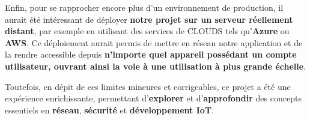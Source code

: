 \documentclass[10pt, a4paper]{report}
\begin{document}
	Enfin, pour se rapprocher encore plus d’un environnement de production, il aurait été intéressant de déployer \textbf{notre projet sur un serveur réellement distant}, par exemple en utilisant des services de CLOUDS tels qu’\textbf{Azure} ou \textbf{AWS}. Ce déploiement aurait permis de mettre en réseau notre application et de la rendre accessible depuis \textbf{n’importe quel appareil possédant un compte utilisateur, ouvrant ainsi la voie à une utilisation à plus grande échelle}. 
	
	Toutefois, en dépit de ces limites mineures et corrigeables, ce projet a été une expérience enrichissante, permettant d’\textbf{explorer} et d’\textbf{approfondir} des concepts essentiels en \textbf{réseau}, \textbf{sécurité} et \textbf{développement IoT}.	
	
	\appendix
	
	
	
	
		
	
	\nocite{*}
	
	
	
	
	\glsaddall
	\printglossaries
	
\end{document}
